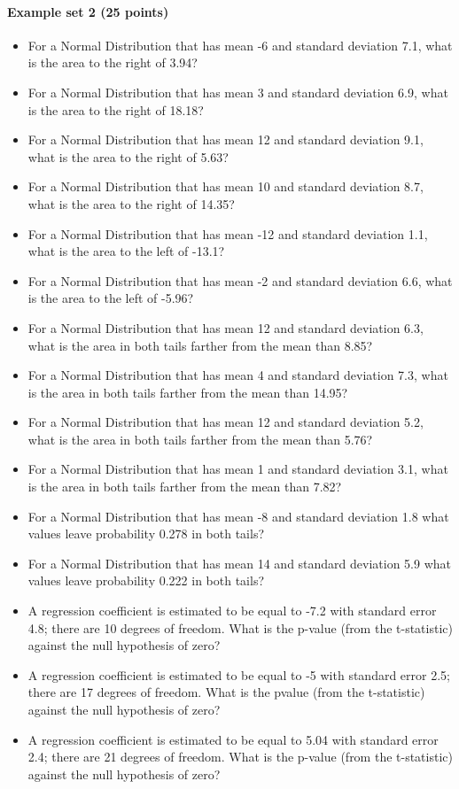 \documentclass[]{article}
\providecommand{\tightlist}{%
  \setlength{\itemsep}{0pt}\setlength{\parskip}{0pt}}
\let\oldparagraph\paragraph
\renewcommand{\paragraph}[1]{\oldparagraph{#1}\mbox{}}
\begin{document}
\paragraph{Example set 2 (25 points)}\label{example-set-2-25-points}

\begin{itemize}
\tightlist
\item
  For a Normal Distribution that has mean -6 and standard deviation 7.1,
  what is the area to the right of 3.94?
\item
  For a Normal Distribution that has mean 3 and standard deviation 6.9,
  what is the area to the right of 18.18?
\item
  For a Normal Distribution that has mean 12 and standard deviation 9.1,
  what is the area to the right of 5.63?
\item
  For a Normal Distribution that has mean 10 and standard deviation 8.7,
  what is the area to the right of 14.35?
\item
  For a Normal Distribution that has mean -12 and standard deviation
  1.1, what is the area to the left of -13.1?
\item
  For a Normal Distribution that has mean -2 and standard deviation 6.6,
  what is the area to the left of -5.96?
\item
  For a Normal Distribution that has mean 12 and standard deviation 6.3,
  what is the area in both tails farther from the mean than 8.85?
\item
  For a Normal Distribution that has mean 4 and standard deviation 7.3,
  what is the area in both tails farther from the mean than 14.95?
\item
  For a Normal Distribution that has mean 12 and standard deviation 5.2,
  what is the area in both tails farther from the mean than 5.76?
\item
  For a Normal Distribution that has mean 1 and standard deviation 3.1,
  what is the area in both tails farther from the mean than 7.82?
\item
  For a Normal Distribution that has mean -8 and standard deviation 1.8
  what values leave probability 0.278 in both tails?
\item
  For a Normal Distribution that has mean 14 and standard deviation 5.9
  what values leave probability 0.222 in both tails?
\item
  A regression coefficient is estimated to be equal to -7.2 with
  standard error 4.8; there are 10 degrees of freedom. What is the
  p-value (from the t-statistic) against the null hypothesis of zero?
\item
  A regression coefficient is estimated to be equal to -5 with standard
  error 2.5; there are 17 degrees of freedom. What is the pvalue (from
  the t-statistic) against the null hypothesis of zero?
\item
  A regression coefficient is estimated to be equal to 5.04 with
  standard error 2.4; there are 21 degrees of freedom. What is the
  p-value (from the t-statistic) against the null hypothesis of zero?
\end{itemize}
\end{document}
